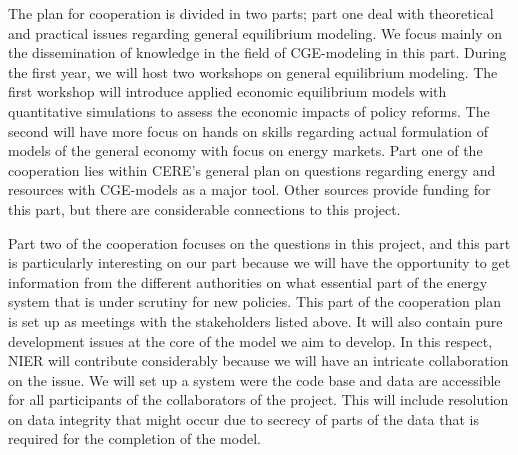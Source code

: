 The plan for cooperation is divided in two parts; part one deal with theoretical and practical issues regarding general equilibrium modeling. We focus mainly on the dissemination of knowledge in the field of CGE-modeling in this part. During the first year, we will host two workshops on general equilibrium modeling. The first workshop will introduce applied economic equilibrium models with quantitative simulations to assess the economic impacts of policy reforms. The second will have more focus on hands on skills regarding actual formulation of models of the general economy with focus on energy markets. Part one of the cooperation lies within CERE's general plan on questions regarding energy and resources with CGE-models as a major tool. Other sources provide funding for this part, but there are considerable connections to this project.

Part two of the cooperation focuses on the questions in this project, and this part is particularly interesting on our part because we will have the opportunity to get information from the different authorities on what essential part of the energy system that is under scrutiny for new policies. This part of the cooperation plan is set up as meetings with the stakeholders listed above. It will also contain pure development issues at the core of the model we aim to develop. In this respect, NIER will contribute considerably because we will have an intricate collaboration on the issue. We will set up a system were the code base and data are accessible for all participants of the collaborators of the project. This will include resolution on data integrity that might occur due to secrecy of parts of the data that is required for the completion of the model.

